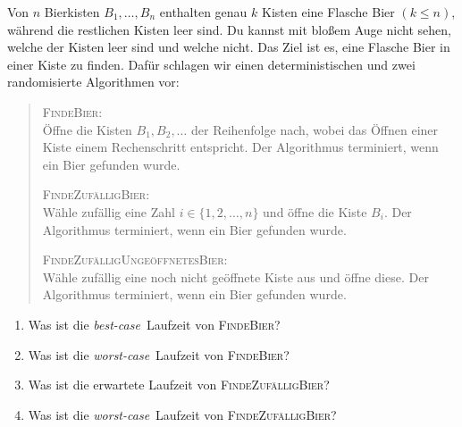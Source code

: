 \documentclass{uebung_cs}
\begin{document}
\begin{exercise}[Bierkisten]
	Von $n$ Bierkisten $B_1,\dots,B_n$ enthalten genau $k$ Kisten eine Flasche Bier $(k \leq n)$, während die restlichen Kisten leer sind. Du kannst mit bloßem Auge nicht sehen, welche der Kisten leer sind und welche nicht. Das Ziel ist es, eine Flasche Bier in einer Kiste zu finden. Dafür schlagen wir einen deterministischen und zwei randomisierte Algorithmen vor:
	\begin{quote}
		\textsc{FindeBier}:\\
		Öffne die Kisten $B_1,B_2,\dots$ der Reihenfolge nach, wobei das Öffnen einer Kiste einem Rechenschritt entspricht.
		Der Algorithmus terminiert, wenn ein Bier gefunden wurde. 

		\textsc{FindeZufälligBier}:\\
		Wähle zufällig eine Zahl $i \in \{1,2,\dots,n\}$ und öffne die Kiste $B_i$.
		Der Algorithmus terminiert, wenn ein Bier gefunden wurde. 

		\textsc{FindeZufälligUngeöffnetesBier}:\\
		Wähle zufällig eine noch nicht geöffnete Kiste aus und öffne diese.	
		Der Algorithmus terminiert, wenn ein Bier gefunden wurde. 
	\end{quote}
	
	\begin{enumerate}
		\item Was ist die \textit{best-case}~Laufzeit von \textsc{FindeBier}?
		\item Was ist die \textit{worst-case}~Laufzeit von \textsc{FindeBier}?
	\end{enumerate}
		
	\begin{enumerate}
		\setcounter{enumi}{2}
		\item Was ist die erwartete Laufzeit von \textsc{FindeZufälligBier}?
		\item Was ist die \textit{worst-case}~Laufzeit von \textsc{FindeZufälligBier}?
	\end{enumerate}	
	

\end{exercise}
\end{document}
